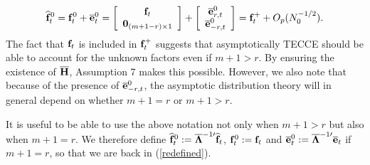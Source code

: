 \documentclass[12pt,fleqn]{article}
\begin{document}
\begin{align}
\widehat{\mathbf{f}}_t^0 = \mathbf{f}_t^{0} + \overline{\mathbf{e}}_t^{0} = \left[\begin{array}{c} \mathbf{f}_t \\
    \mathbf{0}_{(m+1-r)\times 1} \end{array}\right] + \left[\begin{array}{c} \overline{\mathbf{e}}_{r,t}^{0} \\
    \overline{\mathbf{e}}_{-r,t}^{0} \end{array}\right] = \mathbf{f}_t^+ +  O_p(N_0^{-1/2}).
\end{align}
The fact that $\mathbf{f}_t$ is included in $\mathbf{f}_t^+$ suggests that asymptotically TECCE should be able to account for the unknown factors even if $m + 1> r$. By ensuring the existence of $\overline{\mathbf{H}}$, Assumption 7 makes this possible. However, we also note that because of the presence of $\overline{\mathbf{e}}_{-r,t}^0$, the asymptotic distribution theory will in general depend on whether $m+1=r$ or $m +1> r$.

It is useful to be able to use the above notation not only when $m+1> r$ but also when $m+1=r$. We therefore define $\widehat{\mathbf{f}}^0_t:=\overline{\boldsymbol{\Lambda}}^{-1\prime}\widehat{\mathbf{f}}_t$, $\mathbf{f}^0_t := \mathbf{f}_t$ and $\overline{\mathbf{e}}^0_t := \overline{\boldsymbol{\Lambda}}^{-1\prime}\overline{\mathbf{e}}_t$ if $m+1=r$, so that we are back in (\ref{redefined}).
\end{document}
